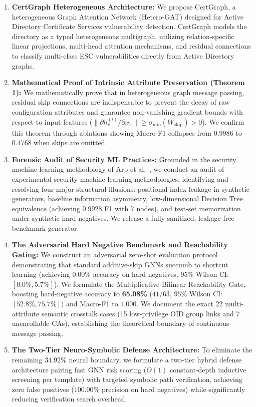 \begin{enumerate}
    \item \textbf{CertGraph Heterogeneous Architecture:} We propose CertGraph, a heterogeneous Graph Attention Network (Hetero-GAT) designed for Active Directory Certificate Services vulnerability detection. CertGraph models the directory as a typed heterogeneous multigraph, utilizing relation-specific linear projections, multi-head attention mechanisms, and residual connections to classify multi-class ESC vulnerabilities directly from Active Directory graphs.
    \item \textbf{Mathematical Proof of Intrinsic Attribute Preservation (Theorem 1):} We mathematically prove that in heterogeneous graph message passing, residual skip connections are indispensable to prevent the decay of raw configuration attributes and guarantee non-vanishing gradient bounds with respect to input features ($\|\partial h_v^{(l)} / \partial x_v\| \ge \sigma_{\min}(W_{\text{skip}}) > 0$). We confirm this theorem through ablations showing Macro-F1 collapses from $0.9986$ to $0.4768$ when skips are omitted.
    \item \textbf{Forensic Audit of Security ML Practices:} Grounded in the security machine learning methodology of Arp et al.~\cite{arp2022dos}, we conduct an audit of experimental security machine learning methodologies, identifying and resolving four major structural illusions: positional index leakage in synthetic generators, baseline information asymmetry, low-dimensional Decision Tree equivalence (achieving $0.9928$ F1 with 7 nodes), and test-set memorization under synthetic hard negatives. We release a fully sanitized, leakage-free benchmark generator.
    \item \textbf{The Adversarial Hard Negative Benchmark and Reachability Gating:} We construct an adversarial zero-shot evaluation protocol demonstrating that standard additive-skip GNNs succumb to shortcut learning (achieving $0.00\%$ accuracy on hard negatives, 95\% Wilson CI: $[0.0\%, 5.7\%]$). We formulate the Multiplicative Bilinear Reachability Gate, boosting hard-negative accuracy to \textbf{65.08\%} ($41/63$, $95\%$ Wilson CI: $[52.8\%, 75.7\%]$) and Macro-F1 to $1.000$. We document the exact 22 multi-attribute semantic crosstalk cases (15 low-privilege OID group links and 7 unenrollable CAs), establishing the theoretical boundary of continuous message passing.
    \item \textbf{The Two-Tier Neuro-Symbolic Defense Architecture:} To eliminate the remaining $34.92\%$ neural boundary, we formulate a two-tier hybrid defense architecture pairing fast GNN risk scoring ($O(1)$ constant-depth inductive screening per template) with targeted symbolic path verification, achieving zero false positives ($100.00\%$ precision on hard negatives) while significantly reducing verification search overhead.

\end{enumerate}
